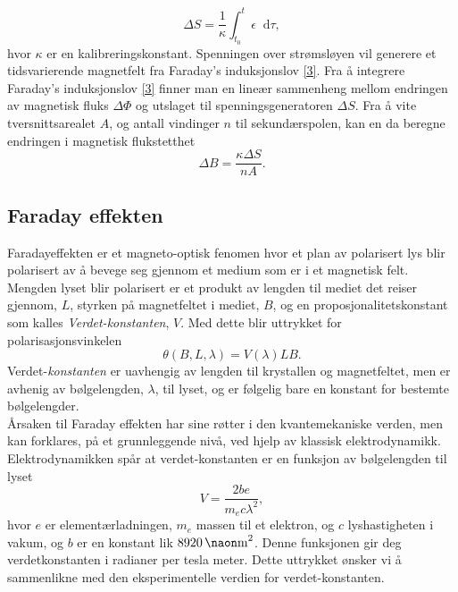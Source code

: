 \documentclass[%
 reprint,
 amsmath,amssymb,
 aps,
 norsk,
]{revtex4-1}
\newcommand*\diff{\mathop{}\!\mathrm{d}}
\begin{document}
\begin{equation*}
  \Delta S = \frac{1}{\kappa}\int_{t_0}^{t}\epsilon \diff \tau, \label{deltas}
\end{equation*}
hvor $\kappa$ er en kalibreringskonstant. Spenningen over strømsløyen vil generere et tidsvarierende magnetfelt fra Faraday's induksjonslov \eqref{3}. Fra å integrere Faraday's induksjonslov \eqref{3} finner man en lineær sammenheng mellom endringen av magnetisk fluks $\Delta \Phi$ og utslaget til spenningsgeneratoren $\Delta S$. Fra å vite tversnittsarealet $A$, og antall vindinger $n$ til sekundærspolen, kan en da beregne endringen i magnetisk flukstetthet
\begin{equation}
  \Delta B = \frac{\kappa\Delta S}{nA}.\label{deltab}
\end{equation}
\subsection{Faraday effekten}
Faradayeffekten er et magneto-optisk fenomen hvor et plan av polarisert lys blir polarisert av å bevege seg gjennom et medium som er i et magnetisk felt. Mengden lyset blir polarisert er et produkt av lengden til mediet det reiser gjennom, $L$, styrken på magnetfeltet i mediet, $B$, og en proposjonalitetskonstant som kalles \textit{Verdet-konstanten}, $V$. Med dette blir uttrykket for polarisasjonsvinkelen
\begin{equation}
  \theta\left(B, L, \lambda\right) = V\left(\lambda\right)LB.\label{verdet}
\end{equation}
Verdet-\textit{konstanten} er uavhengig av lengden til krystallen og magnetfeltet, men er avhenig av bølgelengden, $\lambda$, til lyset, og er følgelig bare en konstant for bestemte bølgelengder.\\
Årsaken til Faraday effekten har sine røtter i den kvantemekaniske verden, men kan forklares, på et grunnleggende nivå, ved hjelp av klassisk elektrodynamikk. Elektrodynamikken spår at verdet-konstanten er en funksjon av bølgelengden til lyset \cite{pdf_task}
\begin{equation}
  V = \frac{2be}{m_ec\lambda^2}, \label{test_verdu2}
\end{equation}
hvor $e$ er elementærladningen, $m_e$ massen til et elektron, og $c$ lyshastigheten i vakum, og $b$ er en konstant lik $\SI{8920}{\naon\meter^2}$. Denne funksjonen gir deg verdetkonstanten i radianer per tesla meter. Dette uttrykket ønsker vi å sammenlikne med den eksperimentelle verdien for verdet-konstanten.
\end{document}
